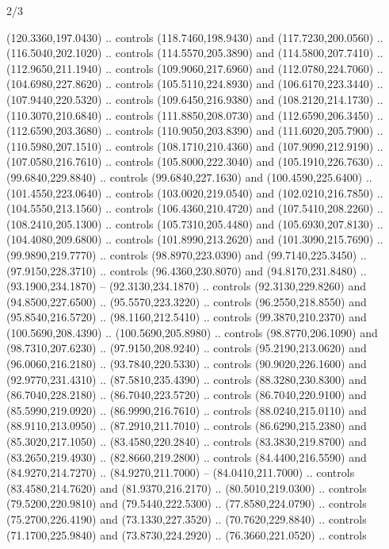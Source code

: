 \begin{flagdescription}{2/3}
\begin{scope}[shift={(0.5\flaglength,0.5)},scale=\flagwidth/480]
\begin{scope}[y=0.8pt, x=0.80pt, yscale=-1,shift={(-450,-300)}]
\begin{scope}[cm={{1.02948,0.0,0.0,1.02948,(-13.26599,6.99414)}}]
\begin{scope}[shift={(341.0917,90.34325)}]
  (120.3360,197.0430) .. controls (118.7460,198.9430) and (117.7230,200.0560) ..
  (116.5040,202.1020) .. controls (114.5570,205.3890) and (114.5800,207.7410) ..
  (112.9650,211.1940) .. controls (109.9060,217.6960) and (112.0780,224.7060) ..
  (104.6980,227.8620) .. controls (105.5110,224.8930) and (106.6170,223.3440) ..
  (107.9440,220.5320) .. controls (109.6450,216.9380) and (108.2120,214.1730) ..
  (110.3070,210.6840) .. controls (111.8850,208.0730) and (112.6590,206.3450) ..
  (112.6590,203.3680) .. controls (110.9050,203.8390) and (111.6020,205.7900) ..
  (110.5980,207.1510) .. controls (108.1710,210.4360) and (107.9090,212.9190) ..
  (107.0580,216.7610) .. controls (105.8000,222.3040) and (105.1910,226.7630) ..
  (99.6840,229.8840) .. controls (99.6840,227.1630) and (100.4590,225.6400) ..
  (101.4550,223.0640) .. controls (103.0020,219.0540) and (102.0210,216.7850) ..
  (104.5550,213.1560) .. controls (106.4360,210.4720) and (107.5410,208.2260) ..
  (108.2410,205.1300) .. controls (105.7310,205.4480) and (105.6930,207.8130) ..
  (104.4080,209.6800) .. controls (101.8990,213.2620) and (101.3090,215.7690) ..
  (99.9890,219.7770) .. controls (98.8970,223.0390) and (99.7140,225.3450) ..
  (97.9150,228.3710) .. controls (96.4360,230.8070) and (94.8170,231.8480) ..
  (93.1900,234.1870) -- (92.3130,234.1870) .. controls (92.3130,229.8260) and
  (94.8500,227.6500) .. (95.5570,223.3220) .. controls (96.2550,218.8550) and
  (95.8540,216.5720) .. (98.1160,212.5410) .. controls (99.3870,210.2370) and
  (100.5690,208.4390) .. (100.5690,205.8980) .. controls (98.8770,206.1090) and
  (98.7310,207.6230) .. (97.9150,208.9240) .. controls (95.2190,213.0620) and
  (96.0060,216.2180) .. (93.7840,220.5330) .. controls (90.9020,226.1600) and
  (92.9770,231.4310) .. (87.5810,235.4390) .. controls (88.3280,230.8300) and
  (86.7040,228.2180) .. (86.7040,223.5720) .. controls (86.7040,220.9100) and
  (85.5990,219.0920) .. (86.9990,216.7610) .. controls (88.0240,215.0110) and
  (88.9110,213.0950) .. (87.2910,211.7010) .. controls (86.6290,215.2380) and
  (85.3020,217.1050) .. (83.4580,220.2840) .. controls (83.3830,219.8700) and
  (83.2650,219.4930) .. (82.8660,219.2800) .. controls (84.4400,216.5590) and
  (84.9270,214.7270) .. (84.9270,211.7000) -- (84.0410,211.7000) .. controls
  (83.4580,214.7620) and (81.9370,216.2170) .. (80.5010,219.0300) .. controls
  (79.5200,220.9810) and (79.5440,222.5300) .. (77.8580,224.0790) .. controls
  (75.2700,226.4190) and (73.1330,227.3520) .. (70.7620,229.8840) .. controls
  (71.1700,225.9840) and (73.8730,224.2920) .. (76.3660,221.0520) .. controls

\end{scope}
\end{scope}
\end{scope}
\end{scope}
\end{flagdescription}
